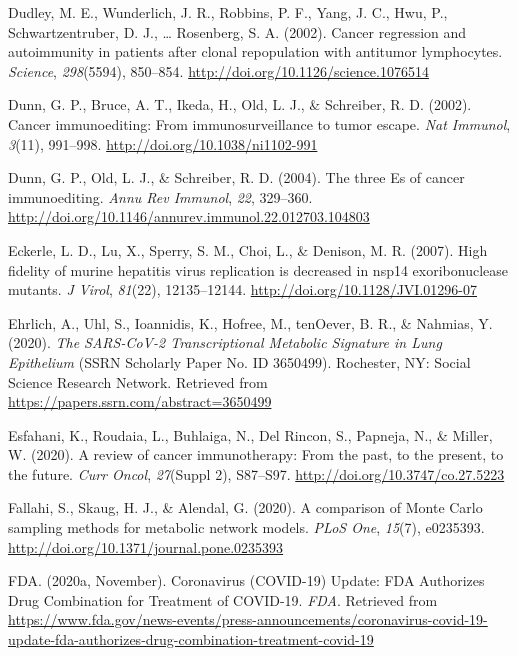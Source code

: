 \documentclass[12pt,twoside,openany,\mydriver]{thesis}  %
\begin{document}
\leavevmode\hypertarget{ref-dudley_cancer_2002}{}%
Dudley, M. E., Wunderlich, J. R., Robbins, P. F., Yang, J. C., Hwu, P., Schwartzentruber, D. J., \ldots{} Rosenberg, S. A. (2002). Cancer regression and autoimmunity in patients after clonal repopulation with antitumor lymphocytes. \emph{Science}, \emph{298}(5594), 850--854. \url{http://doi.org/10.1126/science.1076514}

\leavevmode\hypertarget{ref-dunn_cancer_2002}{}%
Dunn, G. P., Bruce, A. T., Ikeda, H., Old, L. J., \& Schreiber, R. D. (2002). Cancer immunoediting: From immunosurveillance to tumor escape. \emph{Nat Immunol}, \emph{3}(11), 991--998. \url{http://doi.org/10.1038/ni1102-991}

\leavevmode\hypertarget{ref-dunn_three_2004}{}%
Dunn, G. P., Old, L. J., \& Schreiber, R. D. (2004). The three Es of cancer immunoediting. \emph{Annu Rev Immunol}, \emph{22}, 329--360. \url{http://doi.org/10.1146/annurev.immunol.22.012703.104803}

\leavevmode\hypertarget{ref-eckerle_high_2007}{}%
Eckerle, L. D., Lu, X., Sperry, S. M., Choi, L., \& Denison, M. R. (2007). High fidelity of murine hepatitis virus replication is decreased in nsp14 exoribonuclease mutants. \emph{J Virol}, \emph{81}(22), 12135--12144. \url{http://doi.org/10.1128/JVI.01296-07}

\leavevmode\hypertarget{ref-ehrlich_sars-cov-2_2020}{}%
Ehrlich, A., Uhl, S., Ioannidis, K., Hofree, M., tenOever, B. R., \& Nahmias, Y. (2020). \emph{The SARS-CoV-2 Transcriptional Metabolic Signature in Lung Epithelium} (SSRN Scholarly Paper No. ID 3650499). Rochester, NY: Social Science Research Network. Retrieved from \url{https://papers.ssrn.com/abstract=3650499}

\leavevmode\hypertarget{ref-esfahani_review_2020}{}%
Esfahani, K., Roudaia, L., Buhlaiga, N., Del Rincon, S., Papneja, N., \& Miller, W. (2020). A review of cancer immunotherapy: From the past, to the present, to the future. \emph{Curr Oncol}, \emph{27}(Suppl 2), S87--S97. \url{http://doi.org/10.3747/co.27.5223}

\leavevmode\hypertarget{ref-fallahi_comparison_2020}{}%
Fallahi, S., Skaug, H. J., \& Alendal, G. (2020). A comparison of Monte Carlo sampling methods for metabolic network models. \emph{PLoS One}, \emph{15}(7), e0235393. \url{http://doi.org/10.1371/journal.pone.0235393}

\leavevmode\hypertarget{ref-fda_coronavirus_2020}{}%
FDA. (2020a, November). Coronavirus (COVID-19) Update: FDA Authorizes Drug Combination for Treatment of COVID-19. \emph{FDA}. Retrieved from \url{https://www.fda.gov/news-events/press-announcements/coronavirus-covid-19-update-fda-authorizes-drug-combination-treatment-covid-19}
\end{document}
